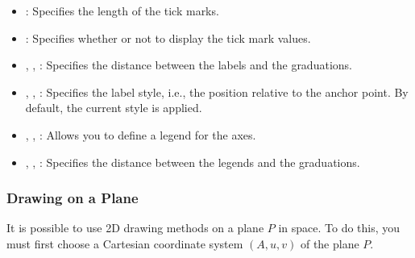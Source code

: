 \begin{itemize}
    \item {}: Specifies the length of the tick marks.

    \item {}: Specifies whether or not to display the tick mark values.

    \item {}, , : Specifies the distance between the labels and the graduations.

    \item {}, , : Specifies the label style, i.e., the position relative to the anchor point. By default, the current style is applied.

    \item {}, , : Allows you to define a legend for the axes.

    \item {}, , : Specifies the distance between the legends and the graduations.
\end{itemize}


\subsubsection{Drawing on a Plane}
It is possible to use 2D drawing methods on a plane $P$ in space. To do this, you must first choose a Cartesian coordinate system $(A,u,v)$ of the plane $P$.

